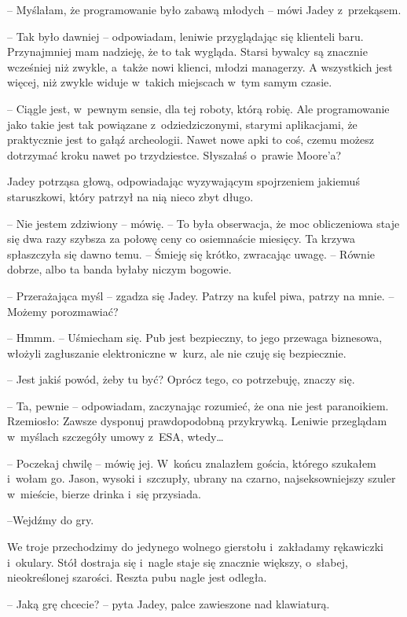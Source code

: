 \documentclass[oneside,polish,12pt,sfheadings]{mwbk}
\begin{document}
-- Myślałam, że programowanie było zabawą młodych -- mówi Jadey z~przekąsem.

-- Tak było dawniej -- odpowiadam, leniwie przyglądając się klienteli
baru. Przynajmniej mam nadzieję, że to tak wygląda. Starsi bywalcy są
znacznie wcześniej niż zwykle, a~także nowi klienci, młodzi managerzy. A
wszystkich jest więcej, niż zwykle widuje w~takich miejscach w~tym samym
czasie. 

-- Ciągle jest, w~pewnym sensie, dla tej roboty, którą robię. Ale
programowanie jako takie jest tak powiązane z~odziedziczonymi, starymi
aplikacjami, że praktycznie jest to gałąź archeologii. Nawet nowe apki
to coś, czemu możesz dotrzymać kroku nawet po trzydziestce. Słyszałaś o~prawie Moore'a?

Jadey potrząsa głową, odpowiadając wyzywającym spojrzeniem jakiemuś
staruszkowi, który patrzył na nią nieco zbyt długo.

-- Nie jestem zdziwiony -- mówię. -- To była obserwacja, że moc
obliczeniowa staje się dwa razy szybsza za połowę ceny co osiemnaście
miesięcy. Ta krzywa spłaszczyła się dawno temu. -- Śmieję się krótko,
zwracając uwagę. -- Równie dobrze, albo ta banda byłaby niczym bogowie.

-- Przerażająca myśl -- zgadza się Jadey. Patrzy na kufel piwa, patrzy na
mnie. -- Możemy porozmawiać?

-- Hmmm. -- Uśmiecham się. Pub jest bezpieczny, to jego przewaga
biznesowa, włożyli zagłuszanie elektroniczne w~kurz, ale nie czuję się
bezpiecznie.

-- Jest jakiś powód, żeby tu być? Oprócz tego, co potrzebuję, znaczy się.

-- Ta, pewnie -- odpowiadam, zaczynając rozumieć, że ona nie jest
paranoikiem. Rzemiosło: Zawsze dysponuj prawdopodobną przykrywką.
Leniwie przeglądam w~myślach szczegóły umowy z~ESA, wtedy\ldots

-- Poczekaj chwilę -- mówię jej. W~końcu znalazłem gościa, którego
szukałem i~wołam go. Jason, wysoki i~szczupły, ubrany na czarno,
najseksowniejszy szuler w~mieście, bierze drinka i~się przysiada. 

--Wejdźmy do gry.

We troje przechodzimy do jedynego wolnego gierstołu i~zakładamy
rękawiczki i~okulary. Stół dostraja się i~nagle staje się znacznie
większy, o~słabej, nieokreślonej szarości. Reszta pubu nagle jest
odległa.

-- Jaką grę chcecie? -- pyta Jadey, palce zawieszone nad klawiaturą.
\end{document}
